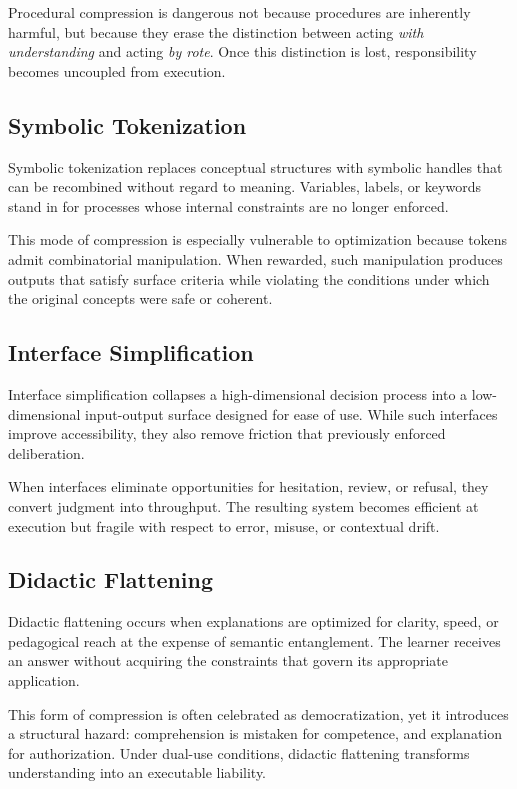 \documentclass[12pt]{article}
\begin{document}
Procedural compression is dangerous not because procedures are inherently harmful, but because they erase the distinction between acting \emph{with understanding} and acting \emph{by rote}. Once this distinction is lost, responsibility becomes uncoupled from execution.

\subsection{Symbolic Tokenization}

Symbolic tokenization replaces conceptual structures with symbolic handles that can be recombined without regard to meaning. Variables, labels, or keywords stand in for processes whose internal constraints are no longer enforced.

This mode of compression is especially vulnerable to optimization because tokens admit combinatorial manipulation. When rewarded, such manipulation produces outputs that satisfy surface criteria while violating the conditions under which the original concepts were safe or coherent.

\subsection{Interface Simplification}

Interface simplification collapses a high-dimensional decision process into a low-dimensional input-output surface designed for ease of use. While such interfaces improve accessibility, they also remove friction that previously enforced deliberation.

When interfaces eliminate opportunities for hesitation, review, or refusal, they convert judgment into throughput. The resulting system becomes efficient at execution but fragile with respect to error, misuse, or contextual drift.

\subsection{Didactic Flattening}

Didactic flattening occurs when explanations are optimized for clarity, speed, or pedagogical reach at the expense of semantic entanglement. The learner receives an answer without acquiring the constraints that govern its appropriate application.

This form of compression is often celebrated as democratization, yet it introduces a structural hazard: comprehension is mistaken for competence, and explanation for authorization. Under dual-use conditions, didactic flattening transforms understanding into an executable liability.
\end{document}
